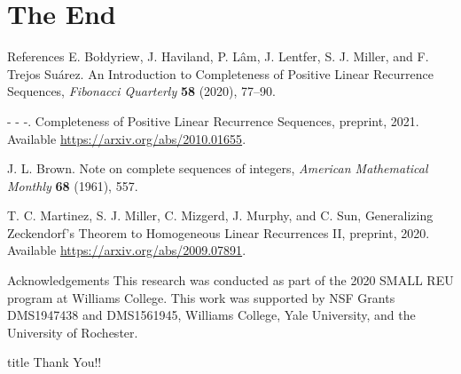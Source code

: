 \documentclass[handout]{beamer}
\theoremstyle{example}
\begin{document}
\section{The End}
\begin{frame}{References}
	E. Bo\l dyriew, J. Haviland, P. L\^am, J. Lentfer, S. J. Miller, and F. Trejos Su\'arez. An Introduction to Completeness of Positive Linear Recurrence Sequences, \emph{Fibonacci Quarterly} \textbf{58} (2020), 77--90.
	
	\bigskip
	-\! -\! -. Completeness of Positive Linear Recurrence Sequences, preprint, 2021. Available \url{https://arxiv.org/abs/2010.01655}.
	
	\bigskip
	J. L. Brown. Note on complete sequences of integers, \emph{American Mathematical Monthly} \textbf{68} (1961), 557.
	
	\bigskip
	T. C. Martinez, S. J. Miller, C. Mizgerd, J. Murphy, and C. Sun, Generalizing Zeckendorf’s Theorem to Homogeneous Linear Recurrences II, preprint, 2020. Available \url{https://arxiv.org/abs/2009.07891}.
\end{frame}

\begin{frame}{Acknowledgements}
	This research was conducted as part of the 2020 SMALL REU program at Williams College. This work was supported by NSF Grants DMS1947438 and DMS1561945, Williams College, Yale University, and the University of Rochester.
\end{frame}

\begin{frame}
	\vfill\centering
	\begin{beamercolorbox}[sep=8pt,center,shadow=true,rounded=true]{title}
		Thank You!!
	\end{beamercolorbox}
	\vfill
\end{frame}
\end{document}

